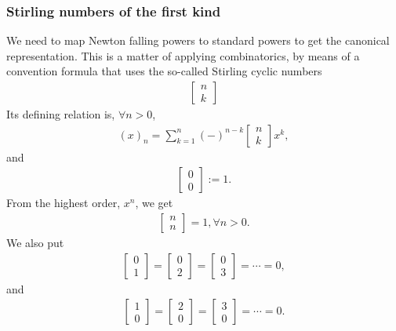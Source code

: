 \documentclass[11pt]{book}
\begin{document}
\subsubsection{Stirling numbers of the first kind}
We need to map Newton falling powers to standard powers to get the canonical representation.  
This is a matter of applying combinatorics, by means of a convention formula that uses the so-called Stirling cyclic numbers 
\begin{eqnarray}
\left[\begin{array}{c}n \\k \end{array}\right]
\end{eqnarray}
Its defining relation is, $\forall n > 0$,
\begin{eqnarray}
(x)_n = \sum_{k=1}^n (-)^{n-k} \left[\begin{array}{c}n \\k \end{array}\right] x^k, 
\end{eqnarray}
and
\begin{eqnarray}
\left[\begin{array}{c}0 \\0 \end{array}\right] := 1.
\end{eqnarray}
From the highest order, $x^n$, we get
\begin{eqnarray}
\left[\begin{array}{c}n \\n \end{array}\right] = 1, \forall n > 0.
\end{eqnarray}
We also put
\begin{eqnarray}
\left[\begin{array}{c}0 \\1 \end{array}\right] = \left[\begin{array}{c}0 \\2 \end{array}\right] = \left[\begin{array}{c}0 \\3 \end{array}\right] = \cdots = 0,
\end{eqnarray}
and
\begin{eqnarray}
\left[\begin{array}{c}1 \\ 0 \end{array}\right] = \left[\begin{array}{c}2  \\ 0 \end{array}\right] =\left[\begin{array}{c}3 \\ 0 \end{array}\right] = \cdots = 0.
\end{eqnarray}
\end{document}
